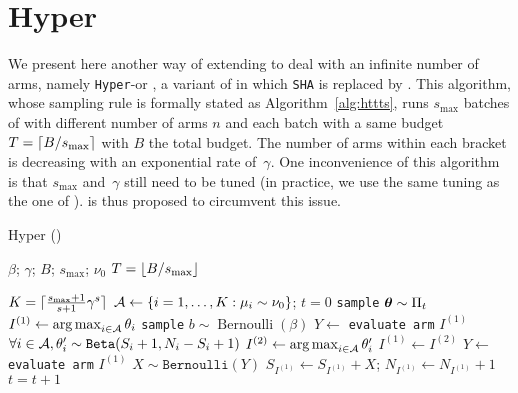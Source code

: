 \section{Hyper \TTTS}\label{app:dttts.httts}

We present here another way of extending \TTTS to deal with an infinite number of arms, namely \texttt{Hyper}-\TTTS or \HTTTS, a variant of \Hyperband in which \texttt{SHA} is replaced by \TTTS. This algorithm, whose sampling rule is formally stated as Algorithm~\ref{alg:httts}, runs $s_{\max}$ batches of \TTTS with different number of arms $n$ and each batch with a same budget $T=\lceil B/s_{\max}\rceil$ with $B$ the total budget. The number of arms within each bracket is decreasing with an exponential rate of~$\gamma$. One inconvenience of this algorithm is that $s_{\max}$ and~$\gamma$ still need to be tuned (in practice, we use the same tuning as the one of \Hyperband). \DTTTS is thus proposed to circumvent this issue. 

\begin{algorithm}[tb]
\centering
\caption{Hyper \TTTS (\HTTTS)}
\label{alg:httts}
\begin{algorithmic}[1] %
     $\beta$; $\gamma$; $B$; $s_{\operatorname{max}}$; $\nu_0$
     $T=\lfloor B/s_{\operatorname{max}}\rfloor$

    	\State $K = \lceil\frac{s_{\operatorname{max}}+1}{s+1}\gamma^s\rceil$
    	\State $\mathcal{A} \leftarrow \{i=1,\ldots,K: \mu_i\sim\nu_0\}$; $t=0$
    		\State \texttt{sample} ${\boldsymbol \theta} \sim \Pi_t$
            \State $I^{(1)} \leftarrow \operatorname*{arg\,max}_{i\in\mathcal{A}}\theta_i$
    	    \State \texttt{sample} $b \sim \operatorname{Bernoulli}(\beta)$
    	        \State $Y \leftarrow$ \texttt{evaluate arm} $I^{(1)}$
    	    \Else
    	            \State $\forall i\in\mathcal{A}, \theta_i' \sim \texttt{Beta}(S_i+1,N_i-S_i+1)$
    	            \State $I^{(2)} \leftarrow \operatorname*{arg\,max}_{i \in \mathcal{A}}\theta_i'$ 
    	        \EndWhile
    	        \State $I^{(1)} \gets I^{(2)}$
    		    \State $Y \leftarrow$ \texttt{evaluate arm} $I^{(1)}$
    	    \EndIf
    	    \State $X \sim \texttt{Bernoulli}(Y)$ 
    	    \State $S_{I^{(1)}} \gets S_{I^{(1)}} + X$; $N_{I^{(1)}} \gets N_{I^{(1)}} + 1$
    		\State $t = t+1$
        \EndWhile
    \EndFor
\end{algorithmic}
\end{algorithm}
